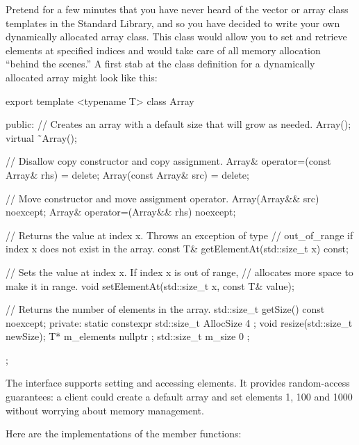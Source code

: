 
Pretend for a few minutes that you have never heard of the vector or array class templates in the Standard Library, and so you have decided to write your own dynamically allocated array class. This class would allow you to set and retrieve elements at specified indices and would take care of all memory allocation “behind the scenes.” A first stab at the class definition for a dynamically allocated array might look like this:

\begin{cpp}
export template <typename T>
class Array
{
    public:
        // Creates an array with a default size that will grow as needed.
        Array();
        virtual ˜Array();

        // Disallow copy constructor and copy assignment.
        Array& operator=(const Array& rhs) = delete;
        Array(const Array& src) = delete;

        // Move constructor and move assignment operator.
        Array(Array&& src) noexcept;
        Array& operator=(Array&& rhs) noexcept;

        // Returns the value at index x. Throws an exception of type
        // out_of_range if index x does not exist in the array.
        const T& getElementAt(std::size_t x) const;

        // Sets the value at index x. If index x is out of range,
        // allocates more space to make it in range.
        void setElementAt(std::size_t x, const T& value);

        // Returns the number of elements in the array.
        std::size_t getSize() const noexcept;
    private:
        static constexpr std::size_t AllocSize { 4 };
        void resize(std::size_t newSize);
        T* m_elements { nullptr };
        std::size_t m_size { 0 };
};
\end{cpp}

The interface supports setting and accessing elements. It provides random-access guarantees: a client could create a default array and set elements 1, 100 and 1000 without worrying about memory management.

Here are the implementations of the member functions:

